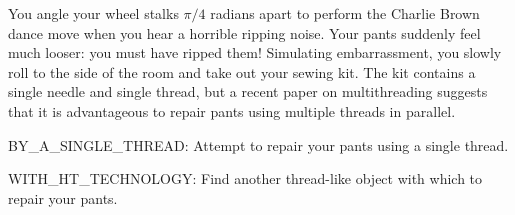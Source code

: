 You angle your wheel stalks $\pi/4$ radians apart
to perform the Charlie Brown dance move
when you hear a horrible ripping noise.
Your pants suddenly feel much looser:
you must have ripped them!
Simulating embarrassment,
you slowly roll to the side of the room and take out your sewing kit.
The kit contains a single needle and single thread,
but a recent paper on multithreading \citep{sol}
suggests that it is advantageous to repair pants
using multiple threads in parallel.

\begin{switch}
\item{BY\_A\_SINGLE\_THREAD}:
  Attempt to repair your pants using a single thread.
\item{WITH\_HT\_TECHNOLOGY}:
  Find another thread-like object with which to repair your pants.
\end{switch}


